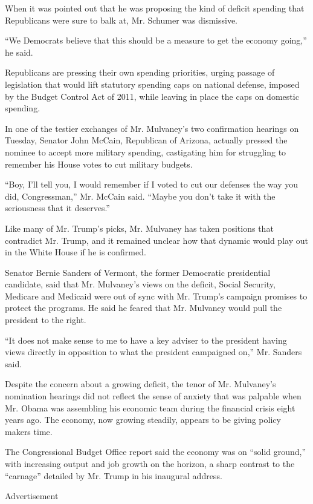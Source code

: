 When it was pointed out that he was proposing the kind of deficit
spending that Republicans were sure to balk at, Mr. Schumer was
dismissive.

``We Democrats believe that this should be a measure to get the economy
going,'' he said.

Republicans are pressing their own spending priorities, urging passage
of legislation that would lift statutory spending caps on national
defense, imposed by the Budget Control Act of 2011, while leaving in
place the caps on domestic spending.

In one of the testier exchanges of Mr. Mulvaney's two confirmation
hearings on Tuesday, Senator John McCain, Republican of Arizona,
actually pressed the nominee to accept more military spending,
castigating him for struggling to remember his House votes to cut
military budgets.

``Boy, I'll tell you, I would remember if I voted to cut our defenses
the way you did, Congressman,'' Mr. McCain said. ``Maybe you don't take
it with the seriousness that it deserves.''

Like many of Mr. Trump's picks, Mr. Mulvaney has taken positions that
contradict Mr. Trump, and it remained unclear how that dynamic would
play out in the White House if he is confirmed.

Senator Bernie Sanders of Vermont, the former Democratic presidential
candidate, said that Mr. Mulvaney's views on the deficit, Social
Security, Medicare and Medicaid were out of sync with Mr. Trump's
campaign promises to protect the programs. He said he feared that Mr.
Mulvaney would pull the president to the right.

``It does not make sense to me to have a key adviser to the president
having views directly in opposition to what the president campaigned
on,'' Mr. Sanders said.

Despite the concern about a growing deficit, the tenor of Mr. Mulvaney's
nomination hearings did not reflect the sense of anxiety that was
palpable when Mr. Obama was assembling his economic team during the
financial crisis eight years ago. The economy, now growing steadily,
appears to be giving policy makers time.

The Congressional Budget Office report said the economy was on ``solid
ground,'' with increasing output and job growth on the horizon, a sharp
contrast to the ``carnage'' detailed by Mr. Trump in his inaugural
address.

Advertisement

